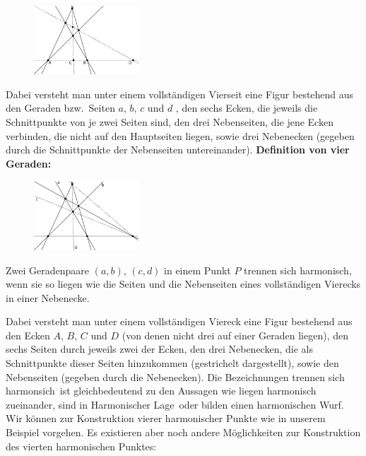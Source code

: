 \documentclass[12pt,a4paper]{article}
\begin{document}
\begin{figure}
\centering
\includegraphics[width=0.35\textwidth]{Bilder/vollstaendigesVierseit.png}
\end{figure}

Dabei versteht man unter einem vollständigen Vierseit eine Figur bestehend aus den Geraden bzw.~Seiten $a$, $b$, $c$ und $d$ , den sechs Ecken, die jeweils die Schnittpunkte von je zwei Seiten sind, den drei Nebenseiten, die jene Ecken verbinden, die nicht auf den Hauptseiten liegen, sowie drei Nebenecken (gegeben durch die Schnittpunkte der Nebenseiten untereinander).
\newline
\newline
\textbf{Definition von vier Geraden:}

\begin{figure}
\centering
\includegraphics[width=0.35\textwidth]{Bilder/vollstaendigesViereck.png}
\end{figure}

Zwei Geradenpaare $(a,b)$, $(c,d)$ in einem Punkt $P$ \glqq trennen sich harmonisch\grqq , wenn sie so liegen wie die Seiten und die Nebenseiten eines vollständigen Vierecks in einer Nebenecke.

Dabei versteht man unter einem vollständigen Viereck eine Figur bestehend aus den Ecken $A$, $B$, $C$ und $D$ (von denen nicht drei auf einer Geraden liegen), den sechs Seiten durch jeweils zwei der Ecken, den drei Nebenecken, die als Schnittpunkte dieser Seiten hinzukommen (gestrichelt dargestellt), sowie den Nebenseiten (gegeben durch die Nebenecken).
\newline
\newline
Die Bezeichnungen \glqq trennen sich harmonsich\grqq ~ist gleichbedeutend zu den Aussagen wie \glqq liegen harmonisch zueinander\grqq , \glqq sind in Harmonischer Lage\grqq ~oder \glqq bilden einen harmonischen Wurf\grqq .
\newline
\newline
Wir können zur Konstruktion vierer harmonischer Punkte wie in unserem Beispiel vorgehen. Es existieren aber noch andere Möglichkeiten zur Konstruktion des vierten harmonischen Punktes:
\end{document}
